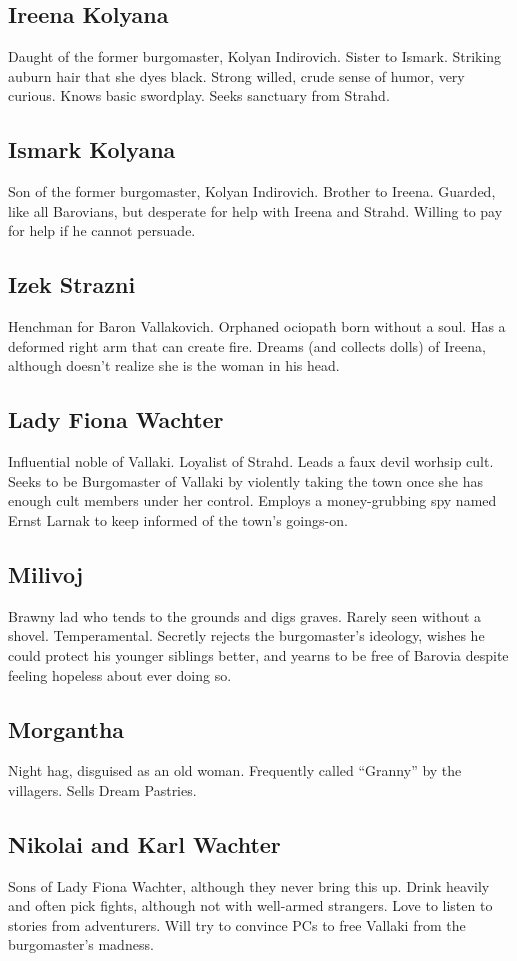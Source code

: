 \documentclass[a4paper,11pt]{article}
\begin{document}
\subsection{Ireena Kolyana}
  Daught of the former burgomaster, Kolyan Indirovich. Sister to Ismark. Striking auburn hair that she dyes 
  black. Strong willed, crude sense of humor, very curious. Knows basic swordplay. Seeks sanctuary from Strahd.
\subsection{Ismark Kolyana}
  Son of the former burgomaster, Kolyan Indirovich. Brother to Ireena. Guarded, like all Barovians, but 
  desperate for help with Ireena and Strahd. Willing to pay for help if he cannot persuade.
\subsection{Izek Strazni}
  Henchman for Baron Vallakovich. Orphaned ociopath born without a soul. Has a deformed right arm that can 
  create fire. Dreams (and collects dolls) of Ireena, although doesn't realize she is the woman in his head.
\subsection{Lady Fiona Wachter}
  Influential noble of Vallaki. Loyalist of Strahd. Leads a faux devil worhsip cult. Seeks to be Burgomaster of 
  Vallaki by violently taking the town once she has enough cult members under her control. Employs a
  money-grubbing spy named Ernst Larnak to keep informed of the town's goings-on.
\subsection{Milivoj}
  Brawny lad who tends to the grounds and digs graves. Rarely seen without a shovel. Temperamental. Secretly 
  rejects the burgomaster's ideology, wishes he could protect his younger siblings better, and yearns to be free 
  of Barovia despite feeling hopeless about ever doing so.
\subsection{Morgantha}
  Night hag, disguised as an old woman. Frequently called ``Granny'' by the villagers. Sells Dream Pastries.
\subsection{Nikolai and Karl Wachter}
  Sons of Lady Fiona Wachter, although they never bring this up. Drink heavily and often pick fights, although
  not with well-armed strangers. Love to listen to stories from adventurers. Will try to convince PCs to free
  Vallaki from the burgomaster's madness.
\end{document}
